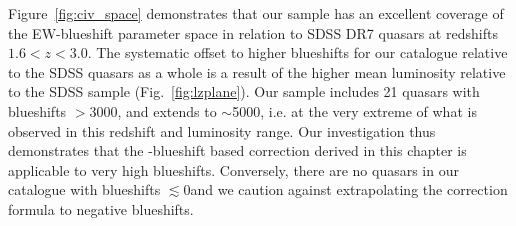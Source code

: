 Figure~\ref{fig:civ_space} demonstrates that our sample has an excellent coverage of the EW-blueshift parameter space in relation to SDSS DR7 quasars at redshifts $1.6 < z < 3.0$. 
The systematic offset to higher  blueshifts for our catalogue relative to the SDSS quasars as a whole is a result of the higher mean luminosity relative to the SDSS sample (Fig.~\ref{fig:lzplane}).
Our sample includes 21 quasars with  blueshifts $>$3000\kms, and extends to $\sim$5000\kms, i.e. at the very extreme of what is observed in this redshift and luminosity range. 
Our investigation thus demonstrates that the -blueshift based correction derived in this chapter is applicable to very high blueshifts. 
Conversely, there are no quasars in our catalogue with  blueshifts $\lesssim$0\kms and we caution against extrapolating the correction formula to negative blueshifts. 

